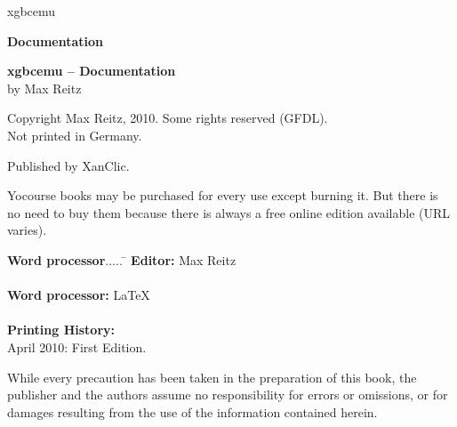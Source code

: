 \documentclass[fleqn,english,openany]{scrbook}
\date{}
\begin{document}
\pagestyle{empty}

\setlength{\parindent}{0mm}

\setcounter{page}{2}

\begin{titlepage}
\begin{center}

{\Huge xgbcemu} \vspace{10mm}

{\large {\bf Documentation}}

\end{center}

\newpage

{\bf xgbcemu -- Documentation} \\
by Max Reitz \vspace{5mm}

Copyright {\textcopyright} Max Reitz, 2010. Some rights reserved (GFDL). \\
Not printed in Germany. \vspace{5mm}

Published by XanClic. \vspace{5mm}

Yocourse books may be purchased for every use except burning it. But there is no need to buy them because there is always
a free online edition available (URL varies). \vspace{5mm}

\begin{tabbing}
{\large \bf Word processor}..... \= \kill
{\large \bf Editor:} \> Max Reitz \\ \\
{\large \bf Word processor:} \> \LaTeX \\ \\
{\large \bf Printing History:} \\
\hspace{5mm} April 2010: \> First Edition.
\end{tabbing}

\vspace{10mm}

While every precaution has been taken in the preparation of this book, the publisher and the authors assume no
responsibility for errors or omissions, or for damages resulting from the use of the information contained herein.

\end{titlepage}

\pagestyle{fancy}

\fancyhf{}
\end{document}
